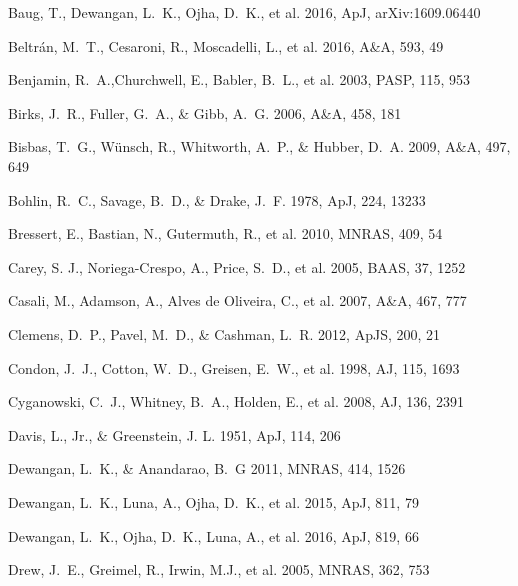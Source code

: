 \documentclass[iop]{emulateapj}
\begin{document}
%
\begin{thebibliography}{}
%
Baug, T., Dewangan, L.~K., Ojha, D.~K., et al. 2016, ApJ, arXiv:1609.06440

Beltr\'{a}n, M.~T., Cesaroni, R., Moscadelli, L., et al. 2016, A\&A, 593, 49

Benjamin, R.~A.,Churchwell, E., Babler, B.~L., et al. 2003, PASP, 115, 953

Birks, J.~R., Fuller, G.~A., \& Gibb, A.~G. 2006, A\&A, 458, 181

Bisbas, T.~G., W\"{u}nsch, R., Whitworth, A.~P., \& Hubber, D.~A. 2009, A\&A, 497, 649

Bohlin, R.~C., Savage, B.~D., \& Drake, J.~F. 1978, ApJ, 224, 13233

Bressert, E., Bastian, N., Gutermuth, R., et al. 2010, MNRAS, 409, 54

Carey, S. J., Noriega-Crespo, A., Price, S.~D., et al. 2005, BAAS, 37, 1252

Casali, M., Adamson, A., Alves de Oliveira, C., et al. 2007, A\&A, 467, 777

Clemens, D.~P., Pavel, M.~D., \& Cashman, L.~R. 2012, ApJS, 200, 21

Condon, J.~J., Cotton, W.~D., Greisen, E.~W., et al. 1998, AJ, 115, 1693

Cyganowski, C.~J., Whitney, B.~A., Holden, E., et al. 2008, AJ, 136, 2391

Davis, L., Jr., \& Greenstein, J. L. 1951, ApJ, 114, 206

Dewangan, L.~K., \& Anandarao, B.~G 2011, MNRAS, 414, 1526

Dewangan, L.~K., Luna, A., Ojha, D.~K., et al.  2015, ApJ, 811, 79

Dewangan, L.~K., Ojha, D.~K., Luna, A., et al.  2016, ApJ, 819, 66

Drew, J.~E., Greimel, R., Irwin, M.J., et al. 2005, MNRAS, 362, 753


\end{thebibliography}
\end{document}
